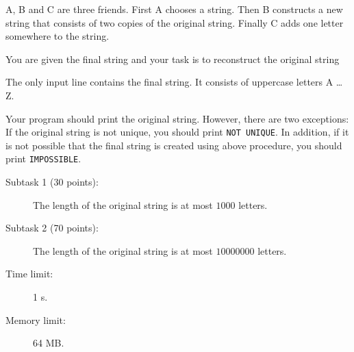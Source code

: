 \documentclass{boi2014}
\begin{document}
    A, B and C are three friends. First A chooses a string. Then
    B constructs a new string that consists of two copies of the original
    string. Finally C adds one letter somewhere to the string.
    

    \Task
    You are given the final string and your task is to reconstruct the original
    string

    \Input
    The only input line contains the final string. It consists of
    uppercase letters A \ldots{} Z.

    \Output
    Your program should print the original string.
    However, there are two exceptions:
    If the original string is not unique, you should print {\tt NOT UNIQUE}.
    In addition, if it is not possible that the final string
    is created using above procedure, you should print {\tt IMPOSSIBLE}.
    

    \Examples


    \Scoring

    \begin{description}
        \item[Subtask 1 (30 points):] The length of the original string is at
        most $1000$ letters.
        \item[Subtask 2 (70 points):] The length of the original string is at
        most $10000000$ letters.
    \end{description}

    \Constraints

    \begin{description}
        \item[Time limit:] 1 s.
        \item[Memory limit:] 64 MB.
    \end{description}
\end{document}
